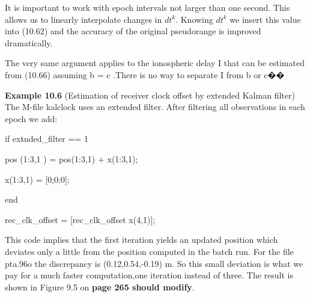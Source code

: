 It is important to work with epoch intervals not larger than one second. This allows us to linearly interpolate changes in $dt^{k}$. Knowing $dt^{k}$ we insert this value into (10.62) and the accuracy of the original pseudorange is improved dramatically.

The very same argument applies to the ionospheric delay I that can be estimated from (10.66) assuming b = c .There is no way to separate I from b or c��

\textbf{Example 10.6} (Estimation of receiver clock offset by extended Kalman filter) The M-file kalclock uses an extended filter. After filtering all observations in each epoch we add:

if ext$\hat{}$nded\_filter == 1

pos (1:3,1 ) = pos(1:3,1) + x(1:3,1);

x(1:3,1) = [0;0;0];

end

rec\_clk\_offset = [rec\_clk\_offset x(4,1)];

This code implies that the first iteration yields an updated position which deviates only a
little from the position computed in the batch run. For the file pta.96o the discrepancy is
(0.12,0.54,-0.19) m. So this small deviation is what we pay for a much faster computation,one iteration instead of three. The result is shown in Figure 9.5 on \textbf{page 265 should modify}.